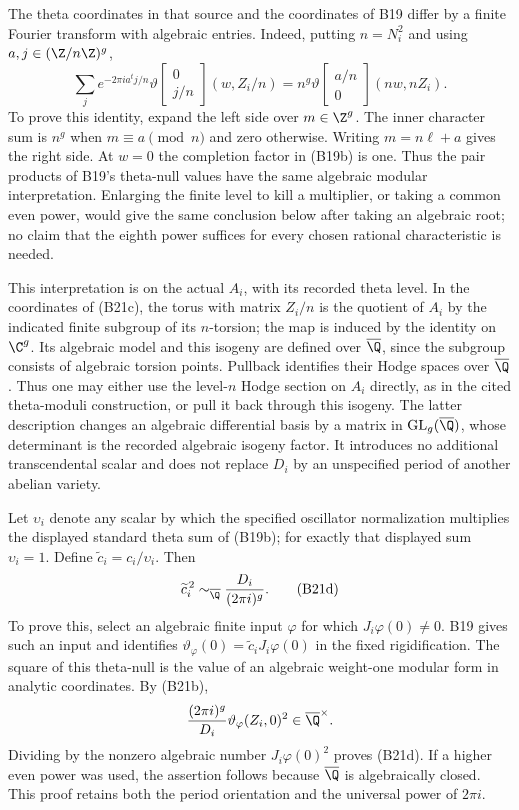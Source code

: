 The theta coordinates in that source and the coordinates of B19
differ by a finite Fourier transform with algebraic entries.
Indeed, putting $n=N_i^2$ and using $a,j\in(\Z/n\Z)^g$,
\[
 \sum_j e^{-2\pi i a^tj/n}
     \vartheta\left[\begin{smallmatrix}0\\j/n\end{smallmatrix}\right]
                       (w,Z_i/n)
   =n^g\vartheta\left[\begin{smallmatrix}a/n\\0\end{smallmatrix}\right]
                       (nw,nZ_i).
 \tag{B21c}
\]
To prove this identity, expand the left side over $m\in\Z^g$.
The inner character sum is $n^g$ when $m\equiv a\pmod n$
and zero otherwise.  Writing $m=n\ell+a$ gives the right side.
At $w=0$ the completion factor in (B19b) is one.
Thus the pair products of B19's theta-null values have the
same algebraic modular interpretation.  Enlarging the finite
level to kill a multiplier, or taking a common even power,
would give the same conclusion below after taking an algebraic
root; no claim that the eighth power suffices for every chosen
rational characteristic is needed.

This interpretation is on the actual $A_i$, with its recorded
theta level.  In the coordinates of (B21c), the torus with
matrix $Z_i/n$ is the quotient of $A_i$ by the indicated
finite subgroup of its $n$-torsion; the map is induced by
the identity on $\C^g$.  Its algebraic model and this isogeny
are defined over $\overline\Q$, since the subgroup consists
of algebraic torsion points.  Pullback identifies their Hodge
spaces over $\overline\Q$.  Thus one may either use the
level-$n$ Hodge section on $A_i$ directly, as in the cited
theta-moduli construction, or pull it back through this
isogeny.  The latter description changes an algebraic
differential basis by a matrix in
$\operatorname{GL}_g(\overline\Q)$, whose determinant is
the recorded algebraic isogeny factor.  It introduces no
additional transcendental scalar and does not replace $D_i$
by an unspecified period of another abelian variety.

Let $\upsilon_i$ denote any scalar by which the specified
oscillator normalization multiplies the displayed standard
theta sum of (B19b); for exactly that displayed sum
$\upsilon_i=1$.  Define $\widetilde c_i=c_i/\upsilon_i$.
Then
\[
             \widetilde c_i^{\,2}
                    \sim_{\overline\Q}
                         \frac{D_i}{(2\pi i)^g}.
 \tag{B21d}
\]
To prove this, select an algebraic finite input $\varphi$ for
which $J_i\varphi(0)\ne0$.  B19 gives such an input and
identifies $\vartheta_\varphi(0)
=\widetilde c_i J_i\varphi(0)$ in the fixed rigidification.
The square of this theta-null is the value of an algebraic
weight-one modular form in analytic coordinates.  By (B21b),
\[
 \frac{(2\pi i)^g}{D_i}
       \vartheta_\varphi(Z_i,0)^2\in\overline\Q^\times.
\]
Dividing by the nonzero algebraic number
$J_i\varphi(0)^2$ proves (B21d).
If a higher even power was used, the assertion follows because
$\overline\Q$ is algebraically closed.  This proof retains
both the period orientation and the universal power of $2\pi i$.

